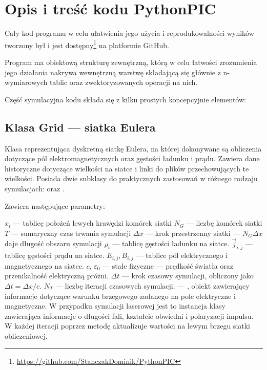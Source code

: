 \section{Opis i treść kodu PythonPIC}\label{sec:code}
Cały kod programu w celu ułatwienia jego użycia i reprodukowalności wyników tworzony był i jest
dostępny\footnote{\url{https://github.com/StanczakDominik/PythonPIC}} na platformie GitHub.

Program ma obiektową strukturę zewnętrzną, którą w celu łatwości
zrozumienia jego działania nakrywa wewnętrzną warstwę składającą się
głównie z n-wymiarowych tablic  oraz zwektoryzowanych
operacji na nich.

Część symulacyjna kodu składa się z kilku prostych koncepcyjnie elementów:

\subsection{Klasa Grid --- siatka Eulera}
Klasa reprezentująca dyskretną siatkę Eulera, na której dokonywane są
obliczenia dotyczące pól elektromagnetycznych oraz gęstości ładunku i
prądu. Zawiera dane historyczne dotyczące wielkości na siatce
i linki do plików  przechowujących te wielkości.
Posiada dwie subklasy do praktycznych zastosowań w różnego rodzaju
symulacjach:  oraz .

Zawiera następujące parametry:
\begin{itemize}
    \itemi{} $x_i$ --- tablicę położeń lewych krawędzi komórek siatki
    \itemi{} $N_G$ --- liczbę komórek siatki
    \itemi{} $T$ --- sumaryczny czas trwania symulacji
    \itemi{} $\Delta x$ --- krok przestrzenny siatki --- $N_G \Delta x$ daje
        długość obszaru symulacji
    \itemi{} $\rho_i$ --- tablicę gęstości ładunku na siatce.
    \itemi{} $\vec{j}_{i,j}$ --- tablicę gęstości prądu na siatce.
    \itemi{} $E_{i,j}, B_{i,j}$ --- tablice pól elektrycznego i magnetycznego na siatce.
    \itemi{} $c$, $\varepsilon_0$ --- stałe fizyczne --- prędkość światła oraz
        przenikalność elektryczną próżni.
    \itemi{} $\Delta t$ --- krok czasowy symulacji, obliczony jako $\Delta t =
        \Delta x / c$.
    \itemi{} $N_T$ --- liczbę iteracji czasowych symulacji.
    \itemi{}  --- , obiekt zawierający informacje dotyczące
        warunku brzegowego zadanego na pole elektryczne i magnetyczne. W przypadku symulacji
        laserowej jest to instancja klasy  zawierająca informacje o
        długości fali, kształcie obwiedni
        i polaryzacji impulsu. W każdej iteracji  poprzez metodę
         aktualizuje wartości na lewym brzegu siatki obliczeniowej.
\end{itemize}

